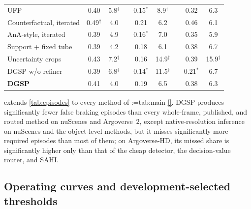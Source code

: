 \documentclass[10pt,letterpaper]{article}
\makeatletter
\newcommand{\method}{DGSP\xspace}
\newcommand{\oursrow}{\rowcolor{oursbg}}
\theoremstyle{remark}
\theoremstyle{plain}
\theoremstyle{definition}
\DeclareRobustCommand{\mref}[1]{\def\mref@list{}\@for\mref@i:=#1\do{\ifx\mref@list\@empty\edef\mref@list{M-\mref@i}\else\edef\mref@list{\mref@list,M-\mref@i}\fi}%
  \edef\mref@cmd{\noexpand\cref*{\mref@list}}\mref@cmd}
\makeatother
\begin{document}
\begin{table}[!htbp]
\begin{tabular}{@{}lcccccccc@{}}
UFP & 0.40 & 5.8$^{\dagger}$ &  & 0.15$^{\ast}$ & 8.9$^{\dagger}$ &  & 0.32 & 6.3 \\
Counterfactual, iterated & 0.49$^{\dagger}$ & 4.0 &  & 0.21 & 6.2 &  & 0.46 & 6.1 \\
AnA-style, iterated & 0.39 & 4.9 &  & 0.16$^{\ast}$ & 7.0 &  & 0.35 & 5.9 \\
Support + fixed tube & 0.39 & 4.2 &  & 0.18 & 6.1 &  & 0.38 & 6.7 \\
Uncertainty crops & 0.43 & 7.2$^{\dagger}$ &  & 0.16 & 14.9$^{\dagger}$ &  & 0.39 & 15.9$^{\dagger}$ \\
\midrule
\method w/o refiner & 0.39 & 6.8$^{\dagger}$ &  & 0.14$^{\ast}$ & 11.5$^{\dagger}$ &  & 0.21$^{\ast}$ & 6.7 \\
\oursrow \textbf{\method} & 0.41 & 4.0 &  & 0.19 & 6.5 &  & 0.38 & 6.3 \\
\bottomrule
\end{tabular}
\end{table}

 extends \cref{tab:episodes} to every method of \mref{tab:main}.
\method produces significantly fewer false braking episodes than every whole-frame, published, and routed method on nuScenes and Argoverse~2, except native-resolution inference on nuScenes and the object-level methods, but it misses significantly more required episodes than most of them; on Argoverse-HD, its missed share is significantly higher only than that of the cheap detector, the decision-value router, and SAHI.

\subsection{Operating curves and development-selected thresholds}
\label{sec:supp_operating}
\end{document}
